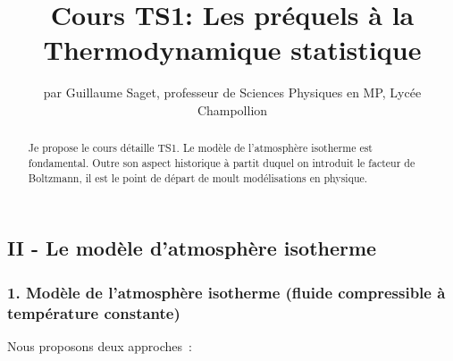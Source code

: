 \documentclass{article}
\title{\huge{\textbf{Cours TS1: Les préquels à la Thermodynamique statistique}}}
\author{par Guillaume Saget, professeur de Sciences Physiques en MP, Lycée Champollion}
\date{}
\begin{document}
\maketitle


\begin{abstract}
Je propose le cours détaille TS1. Le modèle de l'atmosphère
isotherme est fondamental. Outre son aspect historique à partit
duquel on introduit le facteur de Boltzmann, il est le point de
départ de moult modélisations en physique.
\end{abstract}


\subsection*{II - Le modèle d'atmosphère isotherme}
\subsubsection*{1. Modèle de l'atmosphère isotherme (fluide compressible à
température constante)} Nous proposons deux approches :
\end{document}
